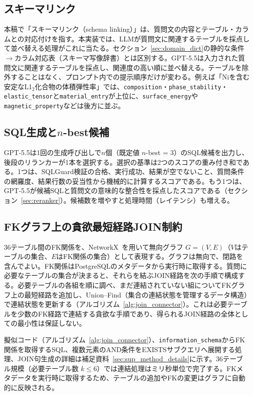 \documentclass[twocolumn]{interact}
\begin{document}
\subsection{スキーマリンク}
\label{sec:schema_link}

本稿で「スキーマリンク（schema linking）」は、質問文の内容とテーブル・カラムとの対応付けを指す。本実装では、LLMが質問文に関連するテーブルを採点して並べ替える処理がこれに当たる。セクション~\ref{sec:domain_dict}の静的な条件$\to$カラム対応表（スキーマ写像辞書）とは区別する。GPT-5.5は入力された質問文に関連するテーブルを採点し、関連度の高い順に並べ替える。テーブルを除外することはなく、プロンプト内での提示順序だけが変わる。例えば「Niを含む安定なL1$_2$化合物の体積弾性率」では、\texttt{composition}・\texttt{phase\_stability}・\texttt{elastic\_tensor}と\texttt{material\_entry}が上位に、\texttt{surface\_energy}や\texttt{magnetic\_property}などは後方に並ぶ。

\subsection{SQL生成と$n$-best候補}
\label{sec:nbest}

GPT-5.5は1回の生成呼び出しで$n$個（既定値 $n$-best = 3）のSQL候補を出力し、後段のリランカーが1本を選択する。選択の基準は2つのスコアの重み付き和である。1つは、SQLGuard検証の合格、実行成功、結果が空でないこと、質問条件の網羅度、結果行数の妥当性から機械的に計算するスコアである。もう1つは、GPT-5.5が候補SQLと質問文の意味的な整合性を採点したスコアである（セクション~\ref{sec:reranker}）。候補数を増やすと処理時間（レイテンシ）も増える。
\subsection{FKグラフ上の貪欲最短経路JOIN制約}
\label{sec:schema_graph}

36テーブル間のFK関係を、NetworkX~\cite{networkx2008}を用いて無向グラフ $G=(V,E)$（$V$はテーブルの集合、$E$はFK関係の集合）として表現する。グラフは無向で、閉路を含んでよい。FK関係はPostgreSQLのメタデータから実行時に取得する。質問に必要なテーブルの集合が決まると、それらを結ぶJOIN経路を次の手順で構成する。必要テーブルの各組を順に調べ、まだ連結されていない組についてFKグラフ上の最短経路を追加し、Union--Find（集合の連結状態を管理するデータ構造）で連結状態を更新する（アルゴリズム~\ref{alg:join_connector}）。これは必要テーブルを少数のFK経路で連結する貪欲な手順であり、得られるJOIN経路の全体としての最小性は保証しない。

擬似コード（アルゴリズム~\ref{alg:join_connector}）、\texttt{information\_schema}からFK関係を取得するSQL、複数元素のAND条件をEXISTSサブクエリへ展開する処理、JOIN句生成の詳細は補足資料~\ref{sec:sup_method_details}に示す。36テーブル規模（必要テーブル数 $k \leq 6$）では連結処理はミリ秒単位で完了する。FKメタデータを実行時に取得するため、テーブルの追加やFKの変更はグラフに自動的に反映される。
\end{document}
